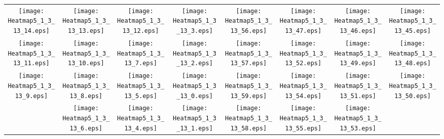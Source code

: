 \documentclass{standalone}
\begin{document}
\begin{tabular}{ *8{c} }
\texttt{[image: Heatmap5\_1\_3\_13\_14.eps]} & \texttt{[image: Heatmap5\_1\_3\_13\_13.eps]} & \texttt{[image: Heatmap5\_1\_3\_13\_12.eps]} & \texttt{[image: Heatmap5\_1\_3\_13\_3.eps]} & \texttt{[image: Heatmap5\_1\_3\_13\_56.eps]} & \texttt{[image: Heatmap5\_1\_3\_13\_47.eps]} & \texttt{[image: Heatmap5\_1\_3\_13\_46.eps]} & \texttt{[image: Heatmap5\_1\_3\_13\_45.eps]} \\
\texttt{[image: Heatmap5\_1\_3\_13\_11.eps]} & \texttt{[image: Heatmap5\_1\_3\_13\_10.eps]} & \texttt{[image: Heatmap5\_1\_3\_13\_7.eps]} & \texttt{[image: Heatmap5\_1\_3\_13\_2.eps]} & \texttt{[image: Heatmap5\_1\_3\_13\_57.eps]} & \texttt{[image: Heatmap5\_1\_3\_13\_52.eps]} & \texttt{[image: Heatmap5\_1\_3\_13\_49.eps]} & \texttt{[image: Heatmap5\_1\_3\_13\_48.eps]} \\
\texttt{[image: Heatmap5\_1\_3\_13\_9.eps]} & \texttt{[image: Heatmap5\_1\_3\_13\_8.eps]} & \texttt{[image: Heatmap5\_1\_3\_13\_5.eps]} & \texttt{[image: Heatmap5\_1\_3\_13\_0.eps]} & \texttt{[image: Heatmap5\_1\_3\_13\_59.eps]} & \texttt{[image: Heatmap5\_1\_3\_13\_54.eps]} & \texttt{[image: Heatmap5\_1\_3\_13\_51.eps]} & \texttt{[image: Heatmap5\_1\_3\_13\_50.eps]} \\
 & \texttt{[image: Heatmap5\_1\_3\_13\_6.eps]} & \texttt{[image: Heatmap5\_1\_3\_13\_4.eps]} & \texttt{[image: Heatmap5\_1\_3\_13\_1.eps]} & \texttt{[image: Heatmap5\_1\_3\_13\_58.eps]} & \texttt{[image: Heatmap5\_1\_3\_13\_55.eps]} & \texttt{[image: Heatmap5\_1\_3\_13\_53.eps]} &  
\end{tabular}
\end{document}
